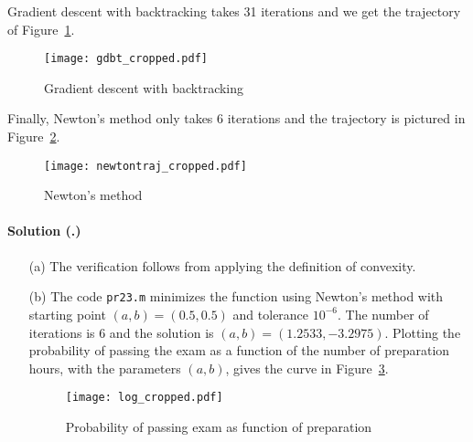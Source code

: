 \documentclass{article}
\newcounter{problemSheetNumber}
\newcounter{problems}
\renewcommand{\solution}[1]{\paragraph{Solution (\theproblemSheetNumber.\theproblems)}\addtocounter{problems}{1}\label{#1}}
\begin{document}
Gradient descent with backtracking takes 31 iterations and we get the trajectory of Figure~\ref{fig:2}.

\begin{figure}[h!]
 \centering
 \texttt{[image: gdbt\_cropped.pdf]}
 \caption{Gradient descent with backtracking}\label{fig:2}
\end{figure}

Finally, Newton's method only takes 6 iterations and the trajectory is pictured in Figure~\ref{fig:3}.

\begin{figure}[h!]
 \centering
 \texttt{[image: newtontraj\_cropped.pdf]}
 \caption{Newton's method}\label{fig:3}
\end{figure}

\solution{pr:3} 
\begin{itemize}
 \item[(a)] The verification follows from applying the definition of convexity.
\item[(b)] The code {\tt pr23.m} minimizes the function using Newton's method with starting point $(a,b)=(0.5,0.5)$ and tolerance $10^{-6}$. The number of iterations is 6 and the solution is $(a,b) = (1.2533,-3.2975)$. Plotting the probability of passing the exam as a function of the number of preparation hours, with the parameters $(a,b)$, gives the curve in Figure~\ref{fig:log}.
\begin{figure}[h!]
 \centering
 \texttt{[image: log\_cropped.pdf]}
 \caption{Probability of passing exam as function of preparation}\label{fig:log}
\end{figure}

\end{itemize}
\end{document}
